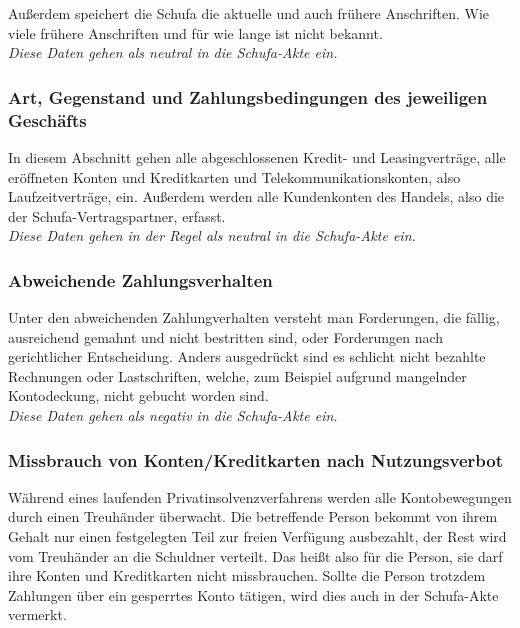 \documentclass[12pt]{article}
\begin{document}
Außerdem speichert die Schufa die aktuelle und auch frühere Anschriften. Wie viele frühere Anschriften und für wie lange ist nicht bekannt.\\

\textit{Diese Daten gehen als neutral in die Schufa-Akte ein.}



\subsubsection*{Art, Gegenstand und Zahlungsbedingungen des jeweiligen Geschäfts}
In diesem Abschnitt gehen alle abgeschlossenen Kredit- und Leasingverträge, alle eröffneten Konten und Kreditkarten und Telekommunikationskonten, also Laufzeitverträge, ein.
Außerdem werden alle Kundenkonten des Handels, also die der Schufa-Vertragspartner, erfasst.\\

\textit{Diese Daten gehen in der Regel als neutral in die Schufa-Akte ein.}



\subsubsection*{Abweichende Zahlungsverhalten}
Unter den abweichenden Zahlungverhalten versteht man Forderungen, die fällig, ausreichend gemahnt und nicht bestritten sind, oder Forderungen nach gerichtlicher Entscheidung.
Anders ausgedrückt sind es schlicht nicht bezahlte Rechnungen oder Lastschriften, welche, zum Beispiel aufgrund mangelnder Kontodeckung, nicht gebucht worden sind.\\

\textit{Diese Daten gehen als negativ in die Schufa-Akte ein.} 



\subsubsection*{Missbrauch von Konten/Kreditkarten nach Nutzungsverbot}
Während eines laufenden Privatinsolvenzverfahrens werden alle Kontobewegungen durch einen Treuhänder überwacht. Die betreffende Person bekommt von ihrem Gehalt nur einen festgelegten Teil zur freien 
Verfügung ausbezahlt, der Rest wird vom Treuhänder an die Schuldner verteilt. Das heißt also für die Person, sie darf ihre Konten und Kreditkarten nicht \glqq missbrauchen\grqq.
Sollte die Person trotzdem Zahlungen über ein gesperrtes Konto tätigen, wird dies auch in der Schufa-Akte vermerkt.\\
\end{document}
